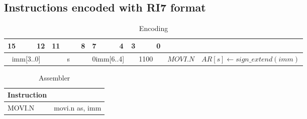 \subsection{Instructions encoded with RI7 format}
\begin{smalltables}
\begin{longtable}{llllllllllllllll  p{1cm}  p{7cm} | }
	\caption{Encoding\label{long}}\\
	15 & & & 12 & 11 & & & 8 & 7 & & & 4 & 3 & & & 0 & & \multicolumn{1}{c}{}\\
	\hline
	\endhead
	\multicolumn{4}{|c|}{imm[3..0]} & \multicolumn{4}{c|}{s} & \multicolumn{4}{c|}{0imm[6..4]} & \multicolumn{4}{c|}{1100} & \multicolumn{1}{c|}{$MOVI.N$} &  $AR[s] \leftarrow sign\_extend(imm)$ \\ \hline
\end{longtable}

\begin{longtable}{|p{5cm}|p{5cm}|}
	\caption{Assembler\label{long}}\\
	\hline
	Instruction & \\
	\hline
	MOVI.N & movi.n as, imm\\ \hline
\end{longtable}
\end{smalltables}